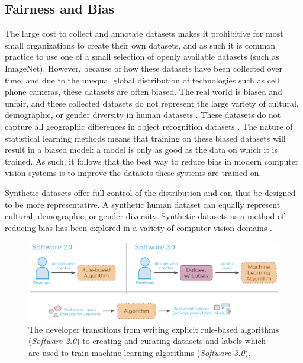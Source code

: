 \documentclass{article}
\begin{document}
\subsection{Fairness and Bias}

The large cost to collect and annotate datasets makes it prohibitive for most small organizations to create their own datasets, and as such it is common practice to use one of a small selection of openly available datasets (such as ImageNet). However, because of how these datasets have been collected over time, and due to the unequal global distribution of technologies such as cell phone cameras, these datasets are often biased. The real world is biased and unfair, and these collected datasets do not represent the large variety of cultural, demographic, or gender diversity  in human datasets \cite{shankar2017classification}. These datasets do not capture all geographic differences in object recognition datasets \cite{DBLP:journals/corr/abs-1906-02659}. The nature of statistical learning methods means that training on these biased datasets will result in a biased model: a model is only as good as the data on which it is trained. As such, it follows that the best way to reduce bias in modern computer vision systems is to improve the datasets these systems are trained on.

Synthetic datasets offer full control of the distribution and can thus be designed to be more representative. A synthetic human dataset can equally represent cultural, demographic, or gender diversity. Synthetic datasets as a method of reducing bias has been explored in a variety of computer vision domains \cite{DBLP:journals/corr/abs-2004-13866}.

\begin{figure}
	\centering
	\includegraphics[width=\textwidth]{software3.png}
	\caption{The developer transitions from writing explicit rule-based algorithms (\emph{Software 2.0}) to creating and curating datasets and labels which are used to train machine learning algorithms (\emph{Software 3.0}).}
	\label{fig:fig2}
\end{figure}
\end{document}
